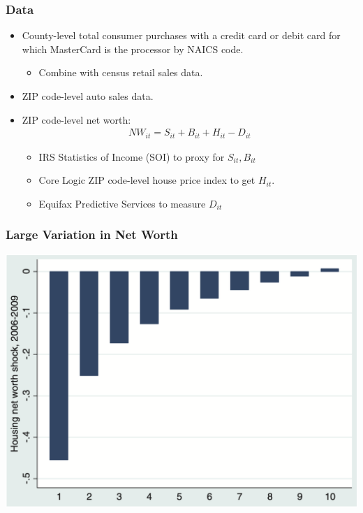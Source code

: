 \documentclass[english,xcolor=svgnames]{beamer}
\begin{document}
\begin{frame}
\frametitle[alignment=center]{Data}
\begin{itemize}
	\item County-level total consumer purchases with a credit card or debit card for which MasterCard is the processor by NAICS code. 
	\begin{itemize}
		\item Combine with census retail sales data.
	\end{itemize}
	\item ZIP code-level auto sales data.
	\item ZIP code-level net worth:
	\begin{align*}
		NW_{it} = S_{it} + B_{it} + H_{it} - D_{it}
	\end{align*}
	\begin{itemize}
		\item IRS Statistics of Income (SOI) to proxy for $S_{it}, B_{it}$
		\item Core Logic ZIP code-level house price index to get $H_{it}$.
		\item Equifax Predictive Services to measure $D_{it}$
	\end{itemize}
\end{itemize}
\end{frame}

\begin{frame}
\frametitle[alignment=center]{Large Variation in Net Worth}
\centering
\includegraphics[scale=0.4]{figures/MRSFIG2.png}
\end{frame}
\end{document}
